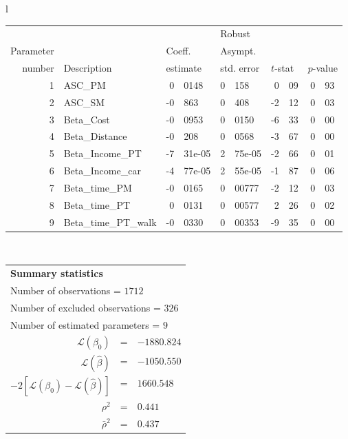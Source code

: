   \begin{tabular}{l}
\begin{tabular}{rlr@{.}lr@{.}lr@{.}lr@{.}l}
         &                       &   \multicolumn{2}{l}{}    & \multicolumn{2}{l}{Robust}  &     \multicolumn{4}{l}{}   \\
Parameter &                       &   \multicolumn{2}{l}{Coeff.}      & \multicolumn{2}{l}{Asympt.}  &     \multicolumn{4}{l}{}   \\
number &  Description                     &   \multicolumn{2}{l}{estimate}      & \multicolumn{2}{l}{std. error}  &   \multicolumn{2}{l}{$t$-stat}  &   \multicolumn{2}{l}{$p$-value}   \\

\hline

1 & ASC_PM  & 0&0148 & 0&158 & 0&09 & 0&93\\
2 & ASC_SM & -0&863 & 0&408 & -2&12 & 0&03\\
3 & Beta_Cost & -0&0953 & 0&0150 & -6&33 & 0&00\\
4 & Beta_Distance & -0&208 & 0&0568 & -3&67 & 0&00\\
5 & Beta_Income_PT & -7&31e-05 & 2&75e-05 & -2&66 & 0&01\\
6 & Beta_Income_car & -4&77e-05 & 2&55e-05 & -1&87 & 0&06\\
7 & Beta_time_PM & -0&0165 & 0&00777 & -2&12 & 0&03\\
8 & Beta_time_PT & 0&0131 & 0&00577 & 2&26 & 0&02\\
9 & Beta_time_PT_walk & -0&0330 & 0&00353 & -9&35 & 0&00\\
\hline
\end{tabular}
\\
\begin{tabular}{rcl}
\multicolumn{3}{l}{\bf Summary statistics}\\
\multicolumn{3}{l}{ Number of observations = $1712$} \\
\multicolumn{3}{l}{ Number of excluded observations = $326$} \\
\multicolumn{3}{l}{ Number of estimated  parameters = $9$} \\
 $\mathcal{L}(\beta_0)$ &=&  $-1880.824$ \\
 $\mathcal{L}(\hat{\beta})$ &=& $-1050.550 $  \\
 $-2[\mathcal{L}(\beta_0) -\mathcal{L}(\hat{\beta})]$ &=& $1660.548$ \\
    $\rho^2$ &=&   $0.441$ \\
    $\bar{\rho}^2$ &=&    $0.437$ \\
\end{tabular}
  \end{tabular}
